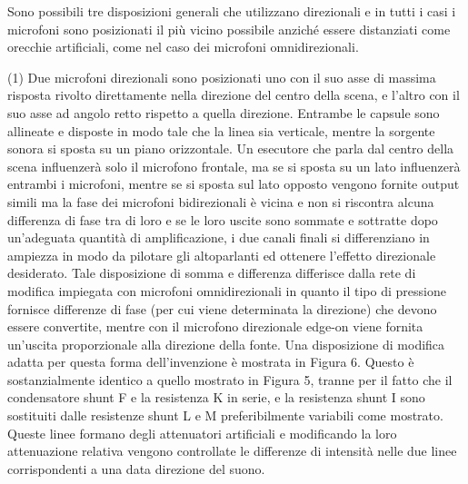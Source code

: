 \documentclass[11pt]{article}
\begin{document}
\begin{multicols*}{2}
Sono possibili tre disposizioni generali che utilizzano direzionali e in tutti i casi i microfoni sono posizionati il più vicino possibile anziché essere distanziati come orecchie artificiali, come nel caso dei microfoni omnidirezionali.

(1) Due microfoni direzionali sono posizionati uno con il suo asse di massima risposta rivolto direttamente nella direzione del centro della scena, e l'altro con il suo asse ad angolo retto rispetto a quella direzione. Entrambe le capsule sono allineate e disposte in modo tale che la linea sia verticale, mentre la sorgente sonora si sposta su un piano orizzontale. Un esecutore che parla dal centro della scena influenzerà solo il microfono frontale, ma se si sposta su un lato influenzerà entrambi i microfoni, mentre se si sposta sul lato opposto vengono fornite output simili ma la fase dei microfoni bidirezionali è vicina e non si riscontra alcuna differenza di fase tra di loro e se le loro uscite sono sommate e  sottratte dopo un'adeguata quantità di amplificazione, i due canali finali si differenziano in ampiezza in modo da pilotare gli altoparlanti ed ottenere l'effetto direzionale desiderato. Tale disposizione di somma e differenza differisce dalla rete di modifica impiegata con microfoni omnidirezionali in quanto il tipo di pressione fornisce differenze di fase (per cui viene determinata la direzione) che devono essere convertite, mentre con il microfono direzionale edge-on viene fornita un'uscita proporzionale alla direzione della fonte. Una disposizione di modifica adatta per questa forma dell'invenzione è mostrata in Figura 6. Questo è sostanzialmente identico a quello mostrato in Figura 5, tranne per il fatto che il condensatore shunt F e la resistenza K in serie, e la resistenza shunt I sono sostituiti dalle resistenze shunt L e M preferibilmente variabili come mostrato. Queste linee formano degli attenuatori artificiali e modificando la loro attenuazione relativa   vengono controllate le differenze di intensità nelle due linee corrispondenti a una data direzione del suono.


\end{multicols*}
\end{document}
